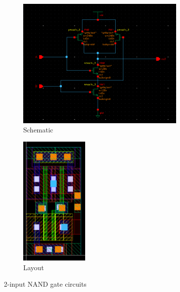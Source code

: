 \begin{figure}[H]
    \begin{subfigure}{0.6\textwidth}
        \centering
        \includegraphics[width=\textwidth,height=6.5cm,keepaspectratio]{./figures/nand2/schematic.png}
        \caption{Schematic}\label{fig:nand2schematic}
    \end{subfigure}
    \hfill
    \begin{subfigure}{0.4\textwidth}
        \centering
        \includegraphics[width=\textwidth,height=6.5cm,keepaspectratio]{./figures/nand2/layout.png}
        \caption{Layout}\label{fig:nand2layout}
    \end{subfigure}
    \caption{2-input NAND gate circuits}
    \end{figure}
    
